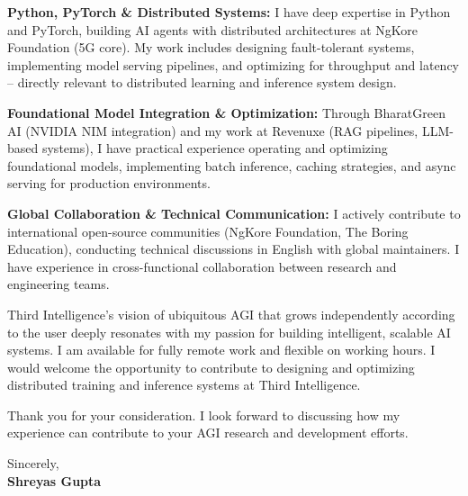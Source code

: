 \documentclass[11pt,letterpaper]{article}
\begin{document}
\vspace{4pt}

\noindent \textbf{Python, PyTorch \& Distributed Systems:} I have deep expertise in Python and PyTorch, building AI agents with distributed architectures at NgKore Foundation (5G core). My work includes designing fault-tolerant systems, implementing model serving pipelines, and optimizing for throughput and latency -- directly relevant to distributed learning and inference system design.

\vspace{4pt}

\noindent \textbf{Foundational Model Integration \& Optimization:} Through BharatGreen AI (NVIDIA NIM integration) and my work at Revenuxe (RAG pipelines, LLM-based systems), I have practical experience operating and optimizing foundational models, implementing batch inference, caching strategies, and async serving for production environments.

\vspace{4pt}

\noindent \textbf{Global Collaboration \& Technical Communication:} I actively contribute to international open-source communities (NgKore Foundation, The Boring Education), conducting technical discussions in English with global maintainers. I have experience in cross-functional collaboration between research and engineering teams.

\vspace{4pt}

\noindent Third Intelligence's vision of ubiquitous AGI that grows independently according to the user deeply resonates with my passion for building intelligent, scalable AI systems. I am available for fully remote work and flexible on working hours. I would welcome the opportunity to contribute to designing and optimizing distributed training and inference systems at Third Intelligence.

\vspace{4pt}

\noindent Thank you for your consideration. I look forward to discussing how my experience can contribute to your AGI research and development efforts.

\vspace{12pt}

\noindent Sincerely, \\
\vspace{4pt}
\noindent \textbf{Shreyas Gupta}
\end{document}
